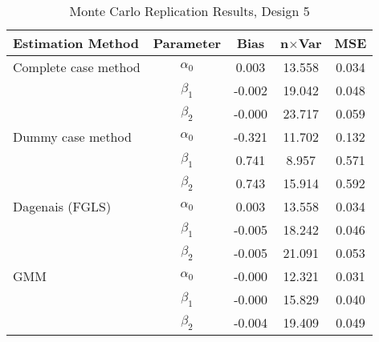 \begin{table}
\centering
\caption{Monte Carlo Replication Results, Design 5}
\label{table:MCReplicationResultsDesign5}
\begin{tabular}{lcccc}
\toprule
Estimation Method & Parameter & Bias & n$\times$Var & MSE \\
\midrule
Complete case method & $\alpha_0$ & 0.003 & 13.558 & 0.034 \\
 & $\beta_1$ & -0.002 & 19.042 & 0.048 \\
 & $\beta_2$ & -0.000 & 23.717 & 0.059 \\
Dummy case method & $\alpha_0$ & -0.321 & 11.702 & 0.132 \\
 & $\beta_1$ & 0.741 & 8.957 & 0.571 \\
 & $\beta_2$ & 0.743 & 15.914 & 0.592 \\
Dagenais (FGLS) & $\alpha_0$ & 0.003 & 13.558 & 0.034 \\
 & $\beta_1$ & -0.005 & 18.242 & 0.046 \\
 & $\beta_2$ & -0.005 & 21.091 & 0.053 \\
GMM & $\alpha_0$ & -0.000 & 12.321 & 0.031 \\
 & $\beta_1$ & -0.000 & 15.829 & 0.040 \\
 & $\beta_2$ & -0.004 & 19.409 & 0.049 \\
\bottomrule
\end{tabular}
\end{table}
